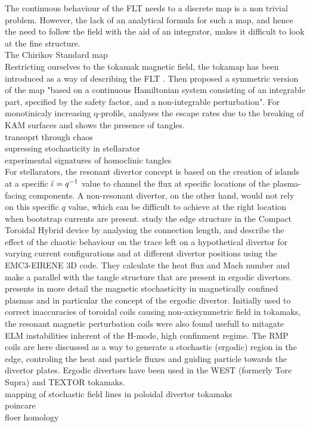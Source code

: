 The continuous behaviour of the FLT needs to a discrete map is a non trivial problem.
However, the lack of an analytical formula for such a map, and hence the need to follow the field with the aid of an integrator, makes it difficult to look at the fine structure.
\\[10pt]
The Chirikov Standard map  
\\[10pt]
Restricting ourselves to the tokamak magnetic field, the tokamap has been introduced as a way of describing the FLT \cite{}. Then \cite{8} proposed a symmetric version of the map "based on a continuous Hamiltonian system consisting of an integrable part, specified by the safety factor, and a non-integrable perturbation". For monotinicaly increasing q-profile, \cite{wingen_stochastic_2005} analyses the escape rates due to the breaking of KAM surfaces and shows the presence of tangles. 
\\[10pt]
transoprt through chaos \cite{easton_transport_1991}
\\[10pt]
supressing stochasticity in stellarator \cite{hanson_elimination_1984}
\\[10pt]


experimental signatures of homoclinic tangles \cite{evans_experimental_2005}
\\[10pt]
For stellarators, the resonant divertor concept is based on the creation of islands at a specific $\Bar{\iota} = q^{-1}$ value to channel the flux at specific locations of the plasma-facing components. A non-resonant divertor, on the other hand, would not rely on this specific $q$ value, which can be difficult to achieve at the right location when bootstrap currents are present. \cite{garcia_exploration_2023} study the edge structure in the Compact Toroidal Hybrid device by analysing the connection length, and describe the effect of the chaotic behaviour on the trace left on a hypothetical divertor for varying current configurations and at different divertor positions using the EMC3-EIRENE 3D code. They calculate the heat flux and Mach number and make a parallel with the tangle structure that are present in ergodic divertors.
\\[10pt]
\cite{abdullaev_magnetic_2014} presents in more detail the magnetic stochasticity in magnetically confined plasmas and in particular the concept of the ergodic divertor. Initially used to correct inaccuracies of toroidal coils causing non-axisymmetric field in tokamaks, the resonant magnetic perturbation coils were also found usefull to mitagate ELM instabilities inherent of the H-mode, high confinment regime. The RMP coils are here discussed as a way to generate a stochastic (ergodic) region in the edge, controling the heat and particle fluxes and guiding particle towards the divertor plates. Ergodic divertors have been used in the WEST (formerly Tore Supra) and TEXTOR tokamaks.
\\[10pt]
mapping of stochastic field lines in poloidal divertor tokamaks \cite{abdullaev_mappings_2006}
\\[10pt]
poincare \cite{poincare_methodes_1892}
\\[10pt]
floer homology \cite{hohloch_homoclinic_2017}\cite{hohloch_transport_2012}

